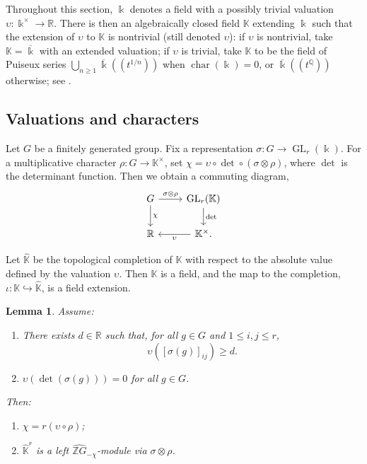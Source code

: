 \documentclass[11pt]{amsart}
\newtheorem{lemma}[theorem]{Lemma}
\theoremstyle{definition}
\newcommand{\Z}{\mathbb{Z}}
\newcommand{\Q}{\mathbb{Q}}
\newcommand{\R}{\mathbb{R}}
\newcommand{\K}{\mathbb{K}}
\renewcommand{\k}{\Bbbk}
\DeclareMathOperator{\ch}{char}
\DeclareMathOperator{\GL}{GL}
\newcommand{\inj}{\hookrightarrow}
\begin{document}
Throughout this section, $\k$ denotes a field with a possibly 
trivial valuation $\upsilon\colon \k^\times \to \R$.
There is then an algebraically closed field $\K$ extending $\k$ 
such that the extension of $\upsilon$ to $\K$ is nontrivial 
(still denoted $\upsilon$): if $\upsilon$ is nontrivial, take 
$\K=\overline{\k}$ with an extended valuation; if $\upsilon$ 
is trivial, take $\K$ to be the field of Puiseux series 
$\bigcup_{n\ge 1}\overline{\k}(\!(t^{1/n})\!)$ when $\ch(\k)=0$, 
or $\overline{\k}(\!(t^{\Q})\!)$ otherwise; see \cite{MacStu}.

\subsection{Valuations and characters}
\label{subsec:vals-chars}
Let $G$ be a finitely generated group. Fix a representation 
$\sigma\colon G\to \GL_r(\k)$.
For a multiplicative character $\rho\colon G\to \K^{\times}$, set 
$\chi= \upsilon\circ \det \circ(\sigma\otimes\rho)$, where $\det$ 
is the determinant function. Then we obtain 
a commuting diagram,
\[
\begin{tikzcd}
    G \ar[d, "\chi"] \ar[r, "\sigma\otimes\rho"] & \GL_r(\K) \ar[d,"\det"]\\
    \R &  \K^{\times}. \ar[l, "\upsilon"]
\end{tikzcd}
\]

Let $\hat{\K}$ be the topological completion of $\K$ with respect 
to the absolute value defined by the valuation $\upsilon$.  Then $\hat{\K}$ 
is a field, and the map to the completion, $\iota\colon \K \inj \hat{\K}$, 
is a field extension.

\begin{lemma}
\label{lem:nov-mod}
Assume:
\begin{enumerate}[label=\upshape(\roman*), itemsep=2pt]
\item There exists $d\in\R$ such that, for all $g\in G$ and $1\le i,j\le r$, 
\begin{equation}
\label{eq:val-bound}
\upsilon([\sigma(g)]_{ij}) \ge d.
\end{equation}
\item $\upsilon(\det(\sigma(g)))=0$ for all $g\in G$.
\end{enumerate}
Then:
\begin{enumerate}[itemsep=2pt]
\item \label{nov1} 
$\chi = r(\upsilon\circ\rho)$;
\item \label{nov2} 
$\hat{\K}^r$ is a left $\widehat{\Z G}_{-\chi}$-module via $\sigma\otimes\rho$.
\end{enumerate}
\end{lemma}
\end{document}
